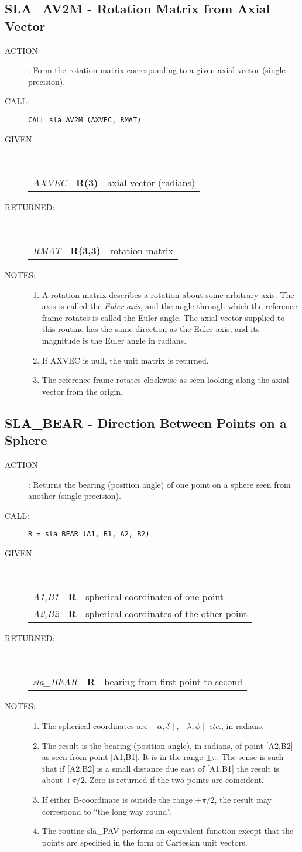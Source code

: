 \documentclass[11pt,twoside]{article}
\newcommand{\xlabel}[1]{}
\newcommand{\radec}     {$[\,\alpha,\delta\,]$}
\newcommand{\routine}[3]
{\hbadness=10000
  \vbox
  {
    \rule{\textwidth}{0.3mm}\\
    {\Large {\bf #1} \hfill #2 \hfill {\bf #1}}\\
    \setlength{\oldspacing}{\topsep}
    \setlength{\topsep}{0.3ex}
    \begin{description}
      #3
    \end{description}
    \setlength{\topsep}{\oldspacing}
  }
}
\renewcommand{\routine}[3]
   {
      \subsection{#1\xlabel{#1} - #2\label{#1}}
       \begin{description}
         #3
       \end{description}
   }
\newcommand{\action}[1]
{\item[ACTION]: #1}
\newcommand{\action}[1]
   {\item[ACTION:] #1}
\newcommand{\call}[1]
{\item[CALL]: \hspace{0.4em}{\tt #1}}
\newlength{\oldspacing}
\renewcommand{\call}[1]
   {
    \item[CALL:] {\tt #1}
   }
\newcommand{\args}[2]
{
  \goodbreak
  \setlength{\oldspacing}{\topsep}
  \setlength{\topsep}{0.3ex}
  \begin{description}
  \item[#1]:\\[1.5ex]
    \begin{tabular}{p{7em}p{6em}p{22em}}
      #2
    \end{tabular}
  \end{description}
  \setlength{\topsep}{\oldspacing}
}
\renewcommand{\args}[2]
   {
     \begin{description}
        \item[#1:]\\
        \begin{tabular}{p{7em}p{6em}l}
           #2
        \end{tabular}
     \end{description}
   }
\newcommand{\spec}[3]
{
  {\em {#1}} & {\bf \mbox{#2}} & {#3}
}
\newcommand{\notes}[1]
{
  \goodbreak
  \setlength{\oldspacing}{\topsep}
  \setlength{\topsep}{0.3ex}
  \begin{description}
    \item[NOTES]:
        #1
  \end{description}
  \setlength{\topsep}{\oldspacing}
}
\renewcommand{\notes}[1]
   {
      \begin{description}
         \item[NOTES:]
            #1
      \end{description}
   }
\begin{document}
\routine{SLA\_AV2M}{Rotation Matrix from Axial Vector}
{
 \action{Form the rotation matrix corresponding to a given axial vector
         (single precision).}
 \call{CALL sla\_AV2M (AXVEC, RMAT)}
}
\args{GIVEN}
{
 \spec{AXVEC}{R(3)}{axial vector (radians)}
}
\args{RETURNED}
{
 \spec{RMAT}{R(3,3)}{rotation matrix}
}
\notes
{
 \begin{enumerate}
  \item A rotation matrix describes a rotation about some arbitrary axis.
        The axis is called the {\it Euler axis}, and the angle through which the
        reference frame rotates is called the Euler angle.  The axial
        vector supplied to this routine has the same direction as the
        Euler axis, and its magnitude is the Euler angle in radians.
  \item If AXVEC is null, the unit matrix is returned.
  \item The reference frame rotates clockwise as seen looking along
        the axial vector from the origin.
 \end{enumerate}
}
\routine{SLA\_BEAR}{Direction Between Points on a Sphere}
{
 \action{Returns the bearing (position angle) of one point on a
         sphere seen from another (single precision).}
 \call{R~=~sla\_BEAR (A1, B1, A2, B2)}
}
\args{GIVEN}
{
 \spec{A1,B1}{R}{spherical coordinates of one point} \\
 \spec{A2,B2}{R}{spherical coordinates of the other point}
}
\args{RETURNED}
{
 \spec{sla\_BEAR}{R}{bearing from first point to second}
}
\notes
{
 \begin{enumerate}
 \item The spherical coordinates are \radec,
       $[\lambda,\phi]$ {\it etc.}, in radians.
 \item The result is the bearing (position angle), in radians,
       of point [A2,B2] as seen
       from point [A1,B1].  It is in the range $\pm \pi$.  The sense
       is such that if [A2,B2]
       is a small distance due east of [A1,B1] the result
       is about $+\pi/2$. Zero is returned
       if the two points are coincident.
 \item If either B-coordinate is outside the range $\pm\pi/2$, the
       result may correspond to ``the long way round''.
 \item The routine sla\_PAV performs an equivalent function except
       that the points are specified in the form of Cartesian unit
       vectors.
 \end{enumerate}
}
\end{document}
